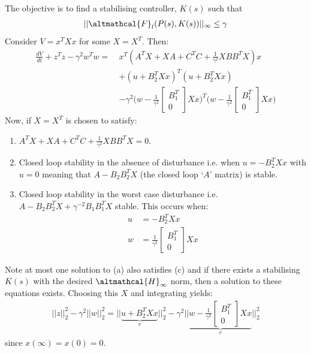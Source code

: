 \documentclass[a4paper]{article}
\newcommand{\ix}[1]{%
  \leavevmode %
  \marginpar{\small\emph{#1}}%
}
\begin{document}
\ix{Objective}The objective is to find a stabilising controller, $K(s)$ such that 
\begin{align}
||\altmathcal{F}_l(P(s), K(s))||_\infty \leq \gamma
\end{align}
Consider $V = x^TX x$ for some $X=X^T$. Then:
\begin{align}
\frac{dV}{dt} + z^T z - \gamma^2 w^T w  =\ \nonumber &x^T (A^TX + XA + C^TC + \frac{1}{\gamma^2}  XBB^TX)x \nonumber \\
&+ (u + B_2^TXx)^T (u + B_2^TXx)  \nonumber\\ 
&-\gamma^2\Bigg( w - \frac{1}{\gamma^2} \begin{bmatrix}
B_1^T \\ 0
\end{bmatrix}Xx \Bigg)^T\Bigg( w - \frac{1}{\gamma^2} \begin{bmatrix}
B_1^T \\ 0
\end{bmatrix}Xx \Bigg)
\end{align}
\ix{Choosing $X$}Now, if $X=X^T$ is chosen to satisfy:
\begin{enumerate}[label=(\alph*): ]
	\item $A^TX + XA + C^TC + \frac{1}{\gamma^2}  XBB^TX = 0$.
	\item Closed loop stability in the absence of disturbance i.e. when $u = -B_2^TXx$ with $u=0$ meaning that $A - B_2B_2^T X$ (the closed loop `$A$' matrix) is stable.
	\item Closed loop stability in the worst case disturbance i.e. $A - B_2B_2^T X + \gamma^{-2} B_1B_1^T X$ stable. This occurs when:
	\begin{align}
	u &= -B_2^T Xx \nonumber \\
	w &= \frac{1}{\gamma^2} \begin{bmatrix}
	B_1^T \\ 0
	\end{bmatrix}Xx \nonumber
	\end{align}
\end{enumerate}
Note at most one solution to (a) also satisfies (c) and if there exists a stabilising $K(s)$ with the desired $\altmathcal{H}_\infty$ norm, then a solution to these equations exists. Choosing this $X$ and integrating yields:
\begin{align}
||z||_2^2 - \gamma^2 ||w||_2^2 = \Big|\Big| \underbrace{u + B_2^T Xx}_{v}\Big|\Big|_2^2 - \gamma^2 \Bigg|\Bigg| \underbrace{  w - \frac{1}{\gamma^2} \begin{bmatrix}
	B_1^T \\ 0
	\end{bmatrix}Xx}_{r} \Bigg|\Bigg|_2^2
\end{align}
since $x(\infty) = x(0) = 0$. 
\end{document}
